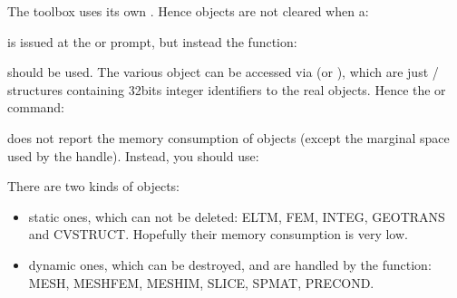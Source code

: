 \documentclass[a4paper,11pt,english]{sphinxmanual}
\begin{document}
\sphinxAtStartPar
The  toolbox uses its own . Hence  objects
are not cleared when a:

\begin{sphinxVerbatim}[commandchars=\\\{\}]
\end{sphinxVerbatim}

\sphinxAtStartPar
is issued at the  or  prompt, but instead the function:

\begin{sphinxVerbatim}[commandchars=\\\{\}]
\end{sphinxVerbatim}

\sphinxAtStartPar
should be used. The various  object can be accessed via  (or
), which are just  /  structures containing 32\sphinxhyphen{}bits integer
identifiers to the real objects. Hence the  or  command:

\begin{sphinxVerbatim}[commandchars=\\\{\}]
\end{sphinxVerbatim}

\sphinxAtStartPar
does not report the memory consumption of  objects (except the marginal space
used by the handle). Instead, you should use:

\begin{sphinxVerbatim}[commandchars=\\\{\}]
\end{sphinxVerbatim}

\sphinxAtStartPar
There are two kinds of  objects:
\begin{itemize}
\item {} 
\sphinxAtStartPar
static ones, which can not be deleted: ELTM, FEM, INTEG, GEOTRANS and CVSTRUCT.
Hopefully their memory consumption is very low.

\item {} 
\sphinxAtStartPar
dynamic ones, which can be destroyed, and are handled by the 
function: MESH, MESHFEM, MESHIM, SLICE, SPMAT, PRECOND.

\end{itemize}
\end{document}
